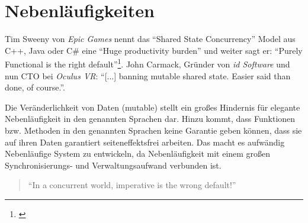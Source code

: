 \section{Nebenläufigkeiten}

Tim Sweeny von \textit{Epic Games} nennt das "`Shared State Concurrency"' Model aus C++, Java oder C\# eine "`Huge productivity burden"' und weiter sagt er: "`Purely Functional is the right default"'\footnote{\cite[Vgl.][Seite 42 u. Seite 56]{Sweeney2006}\label{note:sweeney-mainstream}}. John Carmack, Gründer von \textit{id Software} und nun CTO bei \textit{Oculus VR}: "`[...] banning mutable shared state. Easier said than done, of course."'.

Die Veränderlichkeit von Daten (mutable) stellt ein großes Hindernis für elegante Nebenläufigkeit in den genannten Sprachen dar. Hinzu kommt, dass Funktionen bzw. Methoden in den genannten Sprachen keine Garantie geben können, dass sie auf ihren Daten garantiert seiteneffektsfrei arbeiten. Das macht es aufwändig Nebenläufige System zu entwickeln, da Nebenläufigkeit mit einem großen Synchronisierungs- und Verwaltungsaufwand verbunden ist.

\begin{quote}
"`In a concurrent world, imperative is the wrong default!"'
\end{quote}

